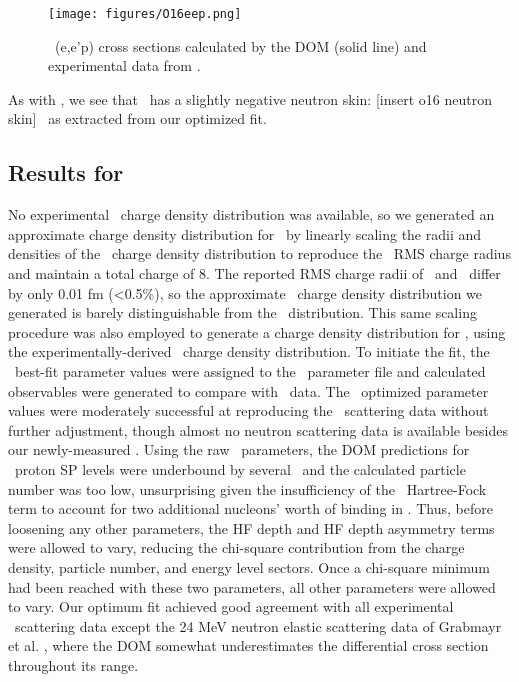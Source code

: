 \begin{figure}[tb]
    \centering
    \texttt{[image: figures/O16eep.png]}
    \caption[\oSix\ (e,e'p) cross sections calculated by the DOM]
    {
        \oSix\ (e,e'p) cross sections calculated by the DOM (solid line) and experimental data from
        \cite{Leuschner1994}.
    }
    \label{O16eep}
\end{figure}

As with \caForty, we see that \oSix\ has a slightly negative neutron skin: [insert o16 neutron skin]
\femto\meter\ as extracted from our optimized fit.

\subsection{Results for \oEight}
No experimental \oEight\ charge density distribution was available, so we generated
an approximate charge density distribution for \oEight\ by linearly scaling
the radii and densities of the \oSix\ charge density distribution to reproduce the \oEight\ RMS charge
radius and maintain a total charge of 8. The reported RMS charge radii of \oSix\ and \oEight\ differ by only
0.01 fm (<0.5\%), so the approximate \oEight\ charge density distribution we generated is barely
distinguishable from the \oSix\ distribution. This same scaling procedure was also employed to
generate a charge density distribution for \snTwelve, using the
experimentally-derived \snFour\ charge density distribution. To initiate the fit, the \oSix\ best-fit parameter values
were assigned to the \oEight\ parameter file and calculated observables were generated to compare
with \oEight\ data. The \oSix\ optimized parameter values were moderately successful at reproducing
the \oEight\ scattering data without further adjustment, though almost no neutron scattering data is
available besides our newly-measured \tot. Using the raw \oSix\ parameters, the DOM predictions for
\oEight\ proton SP levels were underbound by several \mega\electronvolt\
and the calculated particle number was too low, unsurprising
given the insufficiency of the \oSix\ Hartree-Fock term to account for 
two additional nucleons' worth of binding in \oEight. Thus, before
loosening any other parameters, the HF depth and HF depth asymmetry terms were allowed to vary,
reducing the chi-square contribution from the charge density, particle number, and energy level
sectors. Once a chi-square minimum had been reached with these two parameters, all other 
parameters were allowed to vary. Our optimum fit achieved good agreement with all
experimental \oEight\ scattering data except the 24 MeV neutron elastic scattering data
of Grabmayr et al. \cite{Grabmayr1980}, where the DOM somewhat underestimates
the differential cross section throughout its range.

